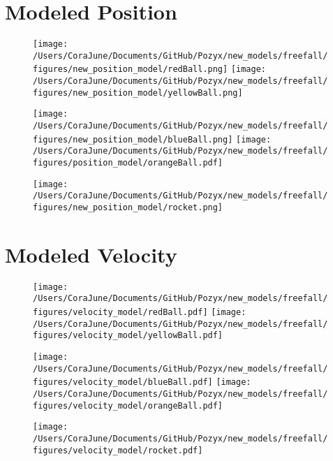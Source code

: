 \documentclass{article}
\begin{document}
\section{Modeled Position}
\begin{figure}[h!]
\begin{multicols}{2}
    \texttt{[image: /Users/CoraJune/Documents/GitHub/Pozyx/new\_models/freefall/figures/new\_position\_model/redBall.png]}
    \texttt{[image: /Users/CoraJune/Documents/GitHub/Pozyx/new\_models/freefall/figures/new\_position\_model/yellowBall.png]}
\end{multicols}

\begin{multicols}{2}
    \texttt{[image: /Users/CoraJune/Documents/GitHub/Pozyx/new\_models/freefall/figures/new\_position\_model/blueBall.png]}
    \texttt{[image: /Users/CoraJune/Documents/GitHub/Pozyx/new\_models/freefall/figures/position\_model/orangeBall.pdf]}

\end{multicols}

\texttt{[image: /Users/CoraJune/Documents/GitHub/Pozyx/new\_models/freefall/figures/new\_position\_model/rocket.png]}

\end{figure}
\newpage
\section{Modeled Velocity}
\begin{figure}[h!]
\begin{multicols}{2}
    \texttt{[image: /Users/CoraJune/Documents/GitHub/Pozyx/new\_models/freefall/figures/velocity\_model/redBall.pdf]}
    \texttt{[image: /Users/CoraJune/Documents/GitHub/Pozyx/new\_models/freefall/figures/velocity\_model/yellowBall.pdf]}
\end{multicols}

\begin{multicols}{2}
    \texttt{[image: /Users/CoraJune/Documents/GitHub/Pozyx/new\_models/freefall/figures/velocity\_model/blueBall.pdf]}
    \texttt{[image: /Users/CoraJune/Documents/GitHub/Pozyx/new\_models/freefall/figures/velocity\_model/orangeBall.pdf]}
\end{multicols}

\texttt{[image: /Users/CoraJune/Documents/GitHub/Pozyx/new\_models/freefall/figures/velocity\_model/rocket.pdf]}
\end{figure}
\newpage
\end{document}
